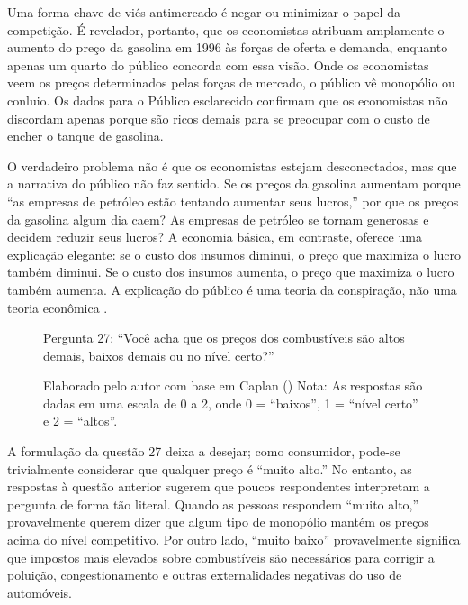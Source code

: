 Uma forma chave de viés antimercado é negar ou minimizar o papel da competição. É revelador, portanto, que os economistas atribuam amplamente o aumento do preço da gasolina em 1996 às forças de oferta e demanda, enquanto apenas um quarto do público concorda com essa visão. Onde os economistas veem os preços determinados pelas forças de mercado, o público vê monopólio ou conluio. Os dados para o Público esclarecido confirmam que os economistas não discordam apenas porque são ricos demais para se preocupar com o custo de encher o tanque de gasolina.

O verdadeiro problema não é que os economistas estejam desconectados, mas que a narrativa do público não faz sentido. Se os preços da gasolina aumentam porque “as empresas de petróleo estão tentando aumentar seus lucros,” por que os preços da gasolina algum dia caem? As empresas de petróleo se tornam generosas e decidem reduzir seus lucros? A economia básica, em contraste, oferece uma explicação elegante: se o custo dos insumos diminui, o preço que maximiza o lucro também diminui. Se o custo dos insumos aumenta, o preço que maximiza o lucro também aumenta. A explicação do público é uma teoria da conspiração, não uma teoria econômica \cite{The_Myth_of_the_Rational_Voter}.

\begin{figure}[H]
    \centering
    \caption*{Pergunta 27: “Você acha que os preços dos combustíveis são altos demais, baixos demais ou no nível certo?”}
    \caption{Elaborado pelo autor com base em Caplan (\citeyear{The_Myth_of_the_Rational_Voter}) \newline
    Nota: As respostas são dadas em uma escala de 0 a 2, onde 0 = “baixos”, 1 = “nível certo” e 2 = “altos”.}
    \label{fig:pergunta_27}
\end{figure}

A formulação da questão 27 deixa a desejar; como consumidor, pode-se trivialmente considerar que qualquer preço é “muito alto.” No entanto, as respostas à questão anterior sugerem que poucos respondentes interpretam a pergunta de forma tão literal. Quando as pessoas respondem “muito alto,” provavelmente querem dizer que algum tipo de monopólio mantém os preços acima do nível competitivo. Por outro lado, “muito baixo” provavelmente significa que impostos mais elevados sobre combustíveis são necessários para corrigir a poluição, congestionamento e outras externalidades negativas do uso de automóveis.

